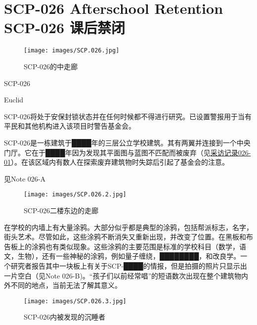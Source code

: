 \chapter[SCP-026 课后禁闭]{
    SCP-026 Afterschool Retention\\
    SCP-026 课后禁闭
}

\label{chap:SCP-026}

\begin{figure}[H]
    \centering
    \texttt{[image: images/SCP.026.jpg]}
    \caption*{SCP-026的中走廊}
\end{figure}

SCP-026

Euclid

SCP-026将处于安保封锁状态并在任何时候都不得进行研究。已设置警报用于当有平民和其他机构进入该项目时警告基金会。

SCP-026是一栋建筑于████年的三层公立学校建筑。其有两翼并连接到一个中央门厅。它在于████年因为发现其平面图与蓝图不匹配而被废弃（见\hyperref[chap:DOC-interview-log-026-01]{采访记录026-01}）。在该区域内有数人在探索废弃建筑物时失踪后引起了基金会的注意。


见Note 026-A

\begin{figure}[H]
    \centering
    \texttt{[image: images/SCP.026.2.jpg]}
    \caption*{SCP-026二楼东边的走廊}
\end{figure}

在学校的内墙上有大量涂鸦。大部分似乎都是典型的涂鸦，包括帮派标志，名字，街头艺术。尽管如此，这些涂鸦不断消失又重新出现，并改变了位置。在黑板和布告板上的涂鸦也有类似现象。这些涂鸦的主要范围是标准的学校科目（数学，语文，生物），还有一些神秘的涂鸦，例如量子缠绕，████████，和改良学。一个研究者报告其中一块板上有关于SCP-████的情报，但是拍摄的照片只显示出一片空白（见Note 026-B)。“孩子们以前经常唱”的短语数次出现在整个建筑物内外不同的地点，当前无法了解其意义。

\begin{figure}[H]
    \centering
    \texttt{[image: images/SCP.026.3.jpg]}
    \caption*{SCP-026内被发现的沉睡者}
\end{figure}

